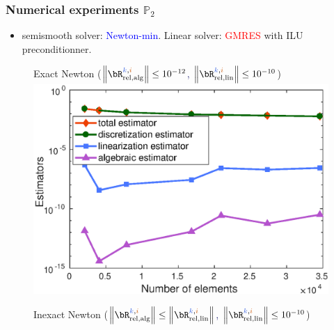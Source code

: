 \begin{frame}
\frametitle{Numerical experiments $\mathbb{P}_2$}

\begin{itemize}
\item 
semismooth solver: \textcolor{blue}{Newton-min}. Linear solver: \textcolor{red}{GMRES} with ILU preconditionner.
\end{itemize}


\begin{figure}
\begin{minipage}[c]{.333\linewidth}
   \centering
   \quad \small{Exact Newton} \scriptsize{\hspace{3 cm} (\textcolor{midnightblue}{$\left\|\bR_{\mathrm{rel,alg}}^{\kk,\ii}\right\| \leq 10^{-12}$, $\left\|\bR_{\mathrm{rel,lin}}^{\kk,\ii}\right\| \leq 10^{-10}$})}
\includegraphics[width=\textwidth]{fig_article_chap_1/exact_resolution_convergence_estimator_number_elements.eps}    \end{minipage}\hfill
\begin{minipage}[c]{.333\linewidth}
   \centering
   \quad \small{Inexact Newton} \hspace{3 cm} \scriptsize{(\textcolor{midnightblue}{$\left\|\bR_{\mathrm{rel,alg}}^{\kk,\ii}\right\| \leq \left\|\bR_{\mathrm{rel,lin}}^{\kk,\ii}\right\|$, $\left\|\bR_{\mathrm{rel,lin}}^{\kk,\ii}\right\| \leq 10^{-10}$})}

\end{minipage}
\end{figure}
\end{frame}
